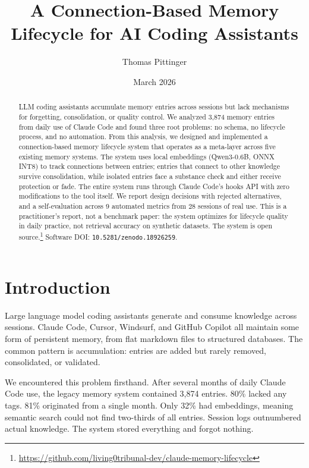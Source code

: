 \documentclass[11pt,a4paper]{article}
\title{A Connection-Based Memory Lifecycle for AI Coding Assistants}
\author{Thomas Pittinger}
\date{March 2026}
\begin{document}
\maketitle

\begin{abstract}
LLM coding assistants accumulate memory entries across sessions but lack mechanisms for forgetting, consolidation, or quality control.
We analyzed 3,874 memory entries from daily use of Claude Code and found three root problems: no schema, no lifecycle process, and no automation.
From this analysis, we designed and implemented a connection-based memory lifecycle system that operates as a meta-layer across five existing memory systems.
The system uses local embeddings (Qwen3-0.6B, ONNX INT8) to track connections between entries; entries that connect to other knowledge survive consolidation, while isolated entries face a substance check and either receive protection or fade.
The entire system runs through Claude Code's hooks API with zero modifications to the tool itself.
We report design decisions with rejected alternatives, and a self-evaluation across 9 automated metrics from 28 sessions of real use.
This is a practitioner's report, not a benchmark paper: the system optimizes for lifecycle quality in daily practice, not retrieval accuracy on synthetic datasets.
The system is open source.\footnote{\url{https://github.com/living0tribunal-dev/claude-memory-lifecycle}} Software DOI: \texttt{10.5281/zenodo.18926259}.
\end{abstract}


\section{Introduction}

Large language model coding assistants generate and consume knowledge across sessions.
Claude Code, Cursor, Windsurf, and GitHub Copilot all maintain some form of persistent memory, from flat markdown files to structured databases.
The common pattern is accumulation: entries are added but rarely removed, consolidated, or validated.

We encountered this problem firsthand.
After several months of daily Claude Code use, the legacy memory system contained 3,874 entries.
80\% lacked any tags.
81\% originated from a single month.
Only 32\% had embeddings, meaning semantic search could not find two-thirds of all entries.
Session logs outnumbered actual knowledge.
The system stored everything and forgot nothing.
\end{document}
